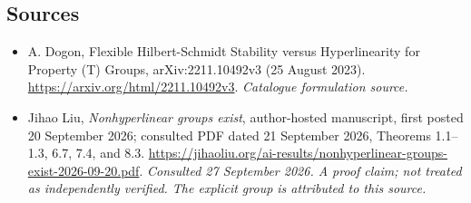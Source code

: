 \documentclass[11pt,a4paper]{article}
\numberwithin{equation}{section}
\begin{document}
\subsection{Sources}
\begin{itemize}\raggedright
\item[\textnormal{[S1]}]\hypertarget{source:30006756:1}{} A. Dogon, Flexible Hilbert-Schmidt Stability versus Hyperlinearity for Property (T) Groups, arXiv:2211.10492v3 (25 August 2023).
\url{https://arxiv.org/html/2211.10492v3}.
{\small\textit{Catalogue formulation source.}}
\item[\textnormal{[E1]}]\hypertarget{extra:30006756:1}{} Jihao Liu,
\emph{Nonhyperlinear groups exist}, author-hosted manuscript, first posted
20 September 2026; consulted PDF dated 21 September 2026, Theorems 1.1--1.3, 6.7, 7.4, and 8.3.
\url{https://jihaoliu.org/ai-results/nonhyperlinear-groups-exist-2026-09-20.pdf}.
{\small\textit{Consulted 27 September 2026. A proof claim; not treated as
independently verified. The explicit group is attributed to this source.}}
\end{itemize}
\end{document}
